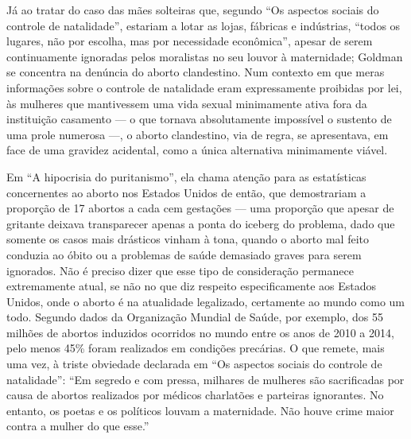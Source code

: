Já ao
tratar do caso das mães solteiras que, segundo ``Os aspectos sociais
do controle de natalidade'', estariam a lotar as lojas, fábricas e
indústrias, ``todos os lugares, não por escolha, mas por
necessidade econômica'', apesar de serem continuamente ignoradas pelos
moralistas no seu louvor à maternidade; Goldman se concentra na denúncia
do aborto clandestino. Num contexto em que meras informações sobre o
controle de natalidade eram expressamente proibidas por lei, às mulheres
que mantivessem uma vida sexual minimamente ativa fora da instituição
casamento --- o que tornava absolutamente impossível o sustento de uma
prole numerosa ---, o aborto clandestino, via de regra, se apresentava,
em face de uma gravidez acidental, como a única alternativa minimamente
viável. 

Em ``A hipocrisia do puritanismo'', ela chama atenção para as
estatísticas concernentes ao aborto nos Estados Unidos de então, que
demostrariam a proporção de 17 abortos a cada cem gestações --- uma
proporção que apesar de gritante deixava transparecer apenas a ponta do
iceberg do problema, dado que somente os casos mais drásticos vinham à
tona, quando o aborto mal feito conduzia ao óbito ou a problemas de
saúde demasiado graves para serem ignorados. Não é preciso dizer que
esse tipo de consideração permanece extremamente atual, se não no que
diz respeito especificamente aos Estados Unidos, onde o aborto é na
atualidade legalizado, certamente ao mundo como um todo. Segundo dados
da Organização Mundial de Saúde, por exemplo, dos 55 milhões de abortos
induzidos ocorridos no mundo entre os anos de 2010 a 2014, pelo menos
45\% foram realizados em condições precárias. O que remete, mais uma
vez, à triste obviedade declarada em ``Os aspectos sociais do controle
de natalidade'': ``Em segredo e com pressa, milhares de mulheres são
sacrificadas por causa de abortos realizados por médicos charlatões e
parteiras ignorantes. No entanto, os poetas e os políticos louvam a
maternidade. Não houve crime maior contra a mulher do que esse.''

